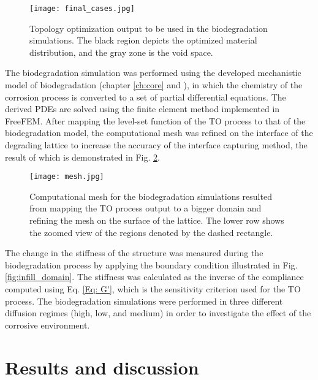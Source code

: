 \begin{figure}[h]
\centering
\medskip
\texttt{[image: final\_cases.jpg]}
\caption[Topology optimization output to be used in the biodegradation simulations]{Topology optimization output to be used in the biodegradation simulations. The black region depicts the optimized material distribution, and the gray zone is the void space. } \label{fig:infill_final_cases}
\end{figure}

The biodegradation simulation was performed using the developed mechanistic model of biodegradation (chapter \ref{ch:core} and \cite{Barzegari2021}), in which the chemistry of the corrosion process is converted to a set of partial differential equations. The derived \gls{PDE}s are solved using the finite element method implemented in FreeFEM. After mapping the level-set function of the \gls{TO} process to that of the biodegradation model, the computational mesh was refined on the interface of the degrading lattice to increase the accuracy of the interface capturing method, the result of which is demonstrated in Fig. \ref{fig:infill_mesh}.


\begin{figure}[h]
\centering
\medskip
\texttt{[image: mesh.jpg]}
\caption[Computational mesh for the biodegradation simulations]{Computational mesh for the biodegradation simulations resulted from mapping the \gls{TO} process output to a bigger domain and refining the mesh on the surface of the lattice. The lower row shows the zoomed view of the regions denoted by the dashed rectangle.} \label{fig:infill_mesh}
\end{figure}

The change in the stiffness of the structure was measured during the biodegradation process by applying the boundary condition illustrated in Fig. \ref{fig:infill_domain}. The stiffness was calculated as the inverse of the compliance computed using Eq. \ref{Eq: G'}, which is the sensitivity criterion used for the \gls{TO} process. The biodegradation simulations were performed in three different diffusion regimes (high, low, and medium) in order to investigate the effect of the corrosive environment. 



\section{Results and discussion}\label{section:infill_results}

